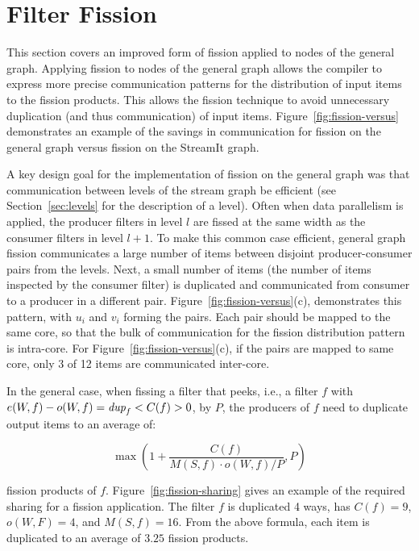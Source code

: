 \section{Filter Fission}

This section covers an improved form of fission applied to nodes of the
general graph.  Applying fission to nodes of the general graph allows
the compiler to express more precise communication patterns for the
distribution of input items to the fission products.  This allows the
fission technique to avoid unnecessary duplication (and thus
communication) of input items.  Figure~\ref{fig:fission-versus}
demonstrates an example of the savings in communication for fission on
the general graph versus fission on the StreamIt graph.

A key design goal for the implementation of fission on the general graph
was that communication between levels of the stream graph be efficient
(see Section~\ref{sec:levels} for the description of a level).  Often
when data parallelism is applied, the producer filters in level $l$ are
fissed at the same width as the consumer filters in level $l + 1$.  To
make this common case efficient, general graph fission communicates a
large number of items between disjoint producer-consumer pairs from the
levels.  Next, a small number of items (the number of items inspected by
the consumer filter) is duplicated and communicated from consumer to a
producer in a different pair.  Figure~\ref{fig:fission-versus}(c),
demonstrates this pattern, with $u_i$ and $v_i$ forming the pairs.  Each
pair should be mapped to the same core, so that the bulk of
communication for the fission distribution pattern is intra-core.  For
Figure~\ref{fig:fission-versus}(c), if the pairs are mapped to same
core, only 3 of 12 items are communicated inter-core.


In the general case, when fissing a filter that peeks, i.e., a filter
$f$ with $e(W, f) - o(W, f) = \mbox{\it dup}_f < C(f) > 0$, by $P$, the producers
of $f$ need to duplicate output items to an average of:

\[ \max \left ( 1 + \frac{C(f)}{M(S, f) \cdot o(W, f) / P}, P \right )\]

\noindent fission products of $f$.  Figure~\ref{fig:fission-sharing}
gives an example of the required sharing for a fission application.
The filter $f$ is duplicated 4 ways, has $C(f) = 9$, $o(W, F) = 4$,
and $M(S, f) = 16$.  From the above formula, each item is duplicated
to an average of $3.25$ fission products.

